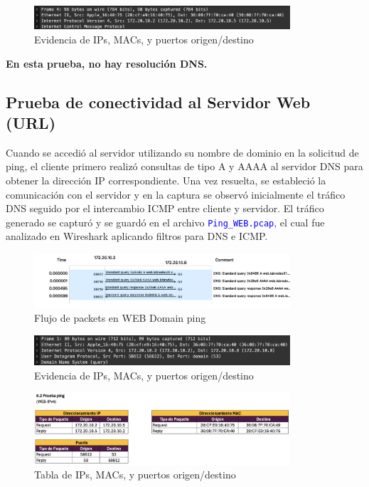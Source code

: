 \documentclass[10pt]{article}
\begin{document}
\begin{figure}[H]
    \centering
    \includegraphics[width=0.85\textwidth]{lab-02-screenshots/8.2-WEB-IP-data}
    \caption{Evidencia de IPs, MACs, y puertos origen/destino}
\end{figure}

\textbf{En esta prueba, no hay resolución DNS.}

\subsection{Prueba de conectividad al Servidor Web (URL)}
Cuando se accedió al servidor utilizando su nombre de dominio en la solicitud de ping, el cliente primero realizó consultas de tipo A y AAAA al servidor DNS para obtener la dirección IP correspondiente. Una vez resuelta, se estableció la comunicación con el servidor y en la captura se observó inicialmente el tráfico DNS seguido por el intercambio ICMP entre cliente y servidor. El tráfico generado se capturó y se guardó en el archivo \textcolor{blue}{\texttt{Ping\_WEB.pcap}}, el cual fue analizado en Wireshark aplicando filtros para DNS e ICMP.


\begin{figure}[H]
    \centering
    \includegraphics[width=0.85\textwidth]{lab-02-screenshots/8.2-WEB-flow}
    \caption{Flujo de packets en WEB Domain ping}
\end{figure}


\begin{figure}[H]
    \centering
    \includegraphics[width=0.85\textwidth]{lab-02-screenshots/8.2-WEB-data}
    \caption{Evidencia de IPs, MACs, y puertos origen/destino}
\end{figure}


\begin{figure}[H]
    \centering
    \includegraphics[width=0.85\textwidth]{lab-02-screenshots/8.2-WEB-IP-table}
    \caption{Tabla de IPs, MACs, y puertos origen/destino}
\end{figure}
\end{document}
